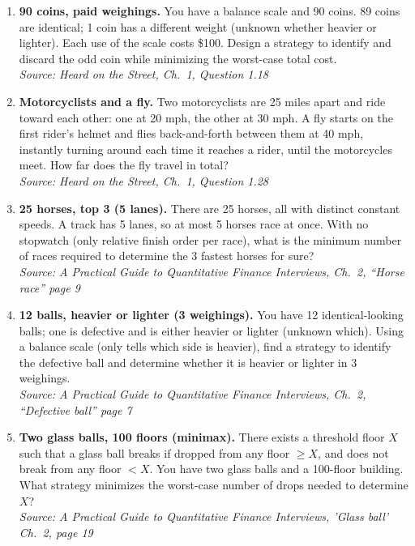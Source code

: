\documentclass[11pt]{article}
\begin{document}
\begin{enumerate}[label=\textbf{\arabic*.}, resume]
\item \textbf{90 coins, paid weighings.} You have a balance scale and 90 coins. 89 coins are identical; 1 coin has a different weight (unknown whether heavier or lighter). Each use of the scale costs \$100. Design a strategy to identify and discard the odd coin while minimizing the worst-case total cost.\\
\hfill{\small\textit{Source: Heard on the Street, Ch.\ 1, Question 1.18 }}

\item \textbf{Motorcyclists and a fly.} Two motorcyclists are 25 miles apart and ride toward each other: one at 20 mph, the other at 30 mph. A fly starts on the first rider’s helmet and flies back-and-forth between them at 40 mph, instantly turning around each time it reaches a rider, until the motorcycles meet. How far does the fly travel in total?\\
\hfill{\small\textit{Source: Heard on the Street, Ch.\ 1, Question 1.28 }}

\item \textbf{25 horses, top 3 (5 lanes).} There are 25 horses, all with distinct constant speeds. A track has 5 lanes, so at most 5 horses race at once. With no stopwatch (only relative finish order per race), what is the minimum number of races required to determine the 3 fastest horses for sure?\\
\hfill{\small\textit{Source: A Practical Guide to Quantitative Finance Interviews, Ch.\ 2, ``Horse race'' page 9}}

\item \textbf{12 balls, heavier or lighter (3 weighings).} You have 12 identical-looking balls; one is defective and is either heavier or lighter (unknown which). Using a balance scale (only tells which side is heavier), find a strategy to identify the defective ball and determine whether it is heavier or lighter in 3 weighings.\\
\hfill{\small\textit{Source: A Practical Guide to Quantitative Finance Interviews, Ch.\ 2, ``Defective ball'' page 7}}

\item \textbf{Two glass balls, 100 floors (minimax).} There exists a threshold floor $X$ such that a glass ball breaks if dropped from any floor $\ge X$, and does not break from any floor $<X$. You have two glass balls and a 100-floor building. What strategy minimizes the worst-case number of drops needed to determine $X$?\\
\hfill{\small\textit{Source: A Practical Guide to Quantitative Finance Interviews, 'Glass ball' Ch.\ 2, page 19 }}


\end{enumerate}
\end{document}
